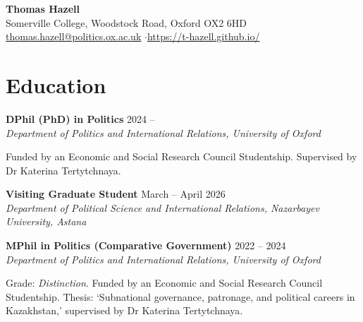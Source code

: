 \documentclass[11pt, a4paper]{article}
\begin{document}
\begin{center}
  {\LARGE\bfseries Thomas Hazell}\\[6pt]
  Somerville College, Woodstock Road, Oxford OX2 6HD\\[2pt]
  \url{thomas.hazell@politics.ox.ac.uk} \enspace$\cdot$\enspace \url{https://t-hazell.github.io/}
\end{center}

\vspace{8pt}


\section{Education}

\begin{samepage}
  \textbf{DPhil (PhD) in Politics} \hfill 2024 -- \phantom{2027}\\
  \textit{Department of Politics and International Relations, University of Oxford}

Funded by an Economic and Social Research Council Studentship. Supervised by Dr Katerina Tertytchnaya.
\end{samepage}

\begin{samepage}
  \textbf{Visiting Graduate Student} \hfill March -- April 2026\\
  \textit{Department of Political Science and International Relations, Nazarbayev University, Astana}
\end{samepage}

\begin{samepage}
  \textbf{MPhil in Politics (Comparative Government)} \hfill 2022 -- 2024\\
  \textit{Department of Politics and International Relations, University of Oxford}

Grade: \textit{Distinction}. Funded by an Economic and Social Research Council Studentship. Thesis: `Subnational governance, patronage, and political careers in Kazakhstan,' supervised by Dr Katerina Tertytchnaya.
\end{samepage}
\end{document}
